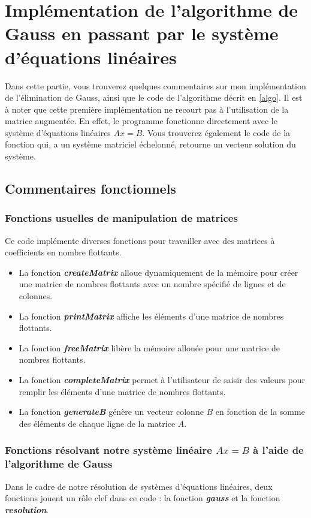 \lstset{
  firstnumber=0, 
  numbers=left,               
  frame=single,
  language=C,                                       
  showstringspaces=false
}
\section{Implémentation de l'algorithme de Gauss en passant par le système d'équations linéaires}
Dans cette partie, vous trouverez quelques commentaires sur mon implémentation de l'élimination de Gauss, ainsi que le code de l'algorithme décrit en \ref{algo}. Il est à noter que cette première implémentation ne recourt pas à l'utilisation de la matrice augmentée. En effet, le programme fonctionne directement avec le système d'équations linéaires $Ax=B$. Vous trouverez également le code de la fonction qui, a un système matriciel échelonné, retourne un vecteur solution du système.
\subsection{Commentaires fonctionnels}
\subsubsection{Fonctions usuelles de manipulation de matrices}\label{fonctusu}
Ce code implémente diverses fonctions pour travailler avec des matrices à coefficients en nombre flottants.\\
\begin{itemize}
\item La fonction \textit{\textbf{createMatrix}} alloue dynamiquement de la mémoire pour créer une matrice de nombres flottants avec un nombre spécifié de lignes et de colonnes.
\item La fonction \textit{\textbf{printMatrix}} affiche les éléments d'une matrice de nombres flottants.
\item La fonction \textit{\textbf{freeMatrix}} libère la mémoire allouée pour une matrice de nombres flottants.
\item La fonction \textit{\textbf{completeMatrix}} permet à l'utilisateur de saisir des valeurs pour remplir les éléments d'une matrice de nombres flottants.
\item La fonction \textit{\textbf{generateB}} génère un vecteur colonne $B$ en fonction de la somme des éléments de chaque ligne de la matrice $A$.
\end{itemize}

\subsubsection{Fonctions résolvant notre système linéaire $Ax=B$ à l'aide de l'algorithme de Gauss}
Dans le cadre de notre résolution de systèmes d'équations linéaires, deux fonctions jouent un rôle clef dans ce code : la fonction \textit{\textbf{gauss}} et la fonction \textit{\textbf{resolution}}.\\

